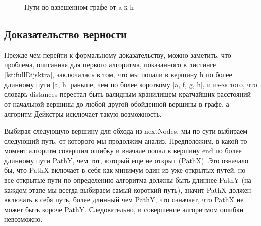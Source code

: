 \documentclass[../article.tex]{subfiles}
\begin{document}
\begin{figure}
    \caption{Пути во взвешенном графе от {\firacodebold a} к {\firacodebold h}}
    \label{fig:dijkstraProve}
\end{figure}

\subsection{Доказательство верности} \label{dijkstraProve}

Прежде чем перейти к формальному доказательству, можно заметить, что проблема, описанная для первого алгоритма, показанного в листинге \ref{lst:fullDijsktra}, заключалась в том, что мы попали в вершину h по более длинному пути [a, h] раньше, чем по более короткому [a, f, g, h], и из-за того, что словарь distances перестал быть валидным хранилищем кратчайших расстояний от начальной вершины до любой другой обойденной вершины в графе, а алгоритм Дейкстры исключает такую возможность.

Выбирая следующую вершину для обхода из nextNodes, мы по сути выбираем следующий путь, от которого мы продолжим анализ. Предположим, в какой-то момент алгоритм совершил ошибку и вначале попал в вершину end по более длинному пути PathY, чем тот, который еще не открыт (PathX). Это означало бы, что PathX включает в себя как минимум один из уже открытых путей, но все открытые пути по определению алгоритма должны быть длиннее PathY (на каждом этапе мы всегда выбираем самый короткий путь), значит PathX должен включать в себя путь, более длинный чем PathY, что означает, что PathX не может быть короче PathY. Следовательно, и совершение алгоритмом ошибки невозможно.
\end{document}
